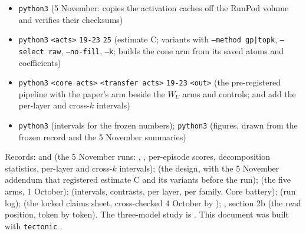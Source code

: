 \documentclass[11pt,a4paper]{article}
\newcommand{\WU}{W_U}
\begin{document}
\begin{itemize}[leftmargin=1.4em,itemsep=0.1em]
\item \texttt{python3}  (5 November: copies the activation caches off the RunPod volume and verifies their checksums)
\item \texttt{python3}   \texttt{<acts>}    \texttt{19-23}  \texttt{25}   (estimate C; variants with \texttt{--method gp|topk}, \texttt{--select raw}, \texttt{--no-fill}, \texttt{--k};  builds the cone arm from its saved atoms and coefficients)
\item \texttt{python3}   \texttt{<core acts>}  \texttt{<transfer acts>}    \texttt{19-23}    \texttt{<out>} (the pre-registered pipeline with the paper's arm beside the $\WU$ arms and controls;  and  add the per-layer and cross-$k$ intervals)
\item \texttt{python3}  (intervals for the frozen numbers); \texttt{python3}  (figures, drawn from the frozen record and the 5 November summaries)
\end{itemize}

Records:  and  (the 5 November runs: , , per-episode scores, decomposition statistics, per-layer and cross-$k$ intervals);  (the design, with the 5 November addendum that registered estimate C and its variants before the run);  (the five arms, 1 October);  (intervals, contrasts, per layer, per family, Core battery);  (run log);  (the locked claims sheet, cross-checked 4 October by ); , section 2b (the read position, token by token). The three-model study is \citet{liang2026jspace}. This document was built with \texttt{tectonic} .
\end{document}
